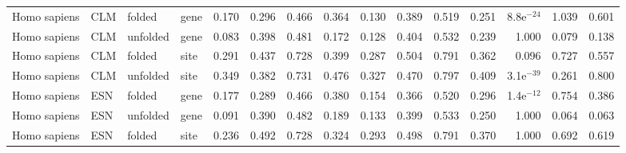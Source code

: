\begin{longtable}{llllrrrrrrrrrrr}
        Homo sapiens &                       CLM &    folded &  gene &                              0.170 &                               0.296 &                 0.466 &                 0.364 &                              0.130 &                               0.389 &                 0.519 &                 0.251 &  8.8e$^{-24}$ &  1.039 &  0.601 \\
        Homo sapiens &                       CLM &  unfolded &  gene &                              0.083 &                               0.398 &                 0.481 &                 0.172 &                              0.128 &                               0.404 &                 0.532 &                 0.239 &         1.000 &  0.079 &  0.138 \\
        Homo sapiens &                       CLM &    folded &  site &                              0.291 &                               0.437 &                 0.728 &                 0.399 &                              0.287 &                               0.504 &                 0.791 &                 0.362 &         0.096 &  0.727 &  0.557 \\
        Homo sapiens &                       CLM &  unfolded &  site &                              0.349 &                               0.382 &                 0.731 &                 0.476 &                              0.327 &                               0.470 &                 0.797 &                 0.409 &  3.1e$^{-39}$ &  0.261 &  0.800 \\
        Homo sapiens &                       ESN &    folded &  gene &                              0.177 &                               0.289 &                 0.466 &                 0.380 &                              0.154 &                               0.366 &                 0.520 &                 0.296 &  1.4e$^{-12}$ &  0.754 &  0.386 \\
        Homo sapiens &                       ESN &  unfolded &  gene &                              0.091 &                               0.390 &                 0.482 &                 0.189 &                              0.133 &                               0.399 &                 0.533 &                 0.250 &         1.000 &  0.064 &  0.063 \\
        Homo sapiens &                       ESN &    folded &  site &                              0.236 &                               0.492 &                 0.728 &                 0.324 &                              0.293 &                               0.498 &                 0.791 &                 0.370 &         1.000 &  0.692 &  0.619 \\

\end{longtable}
